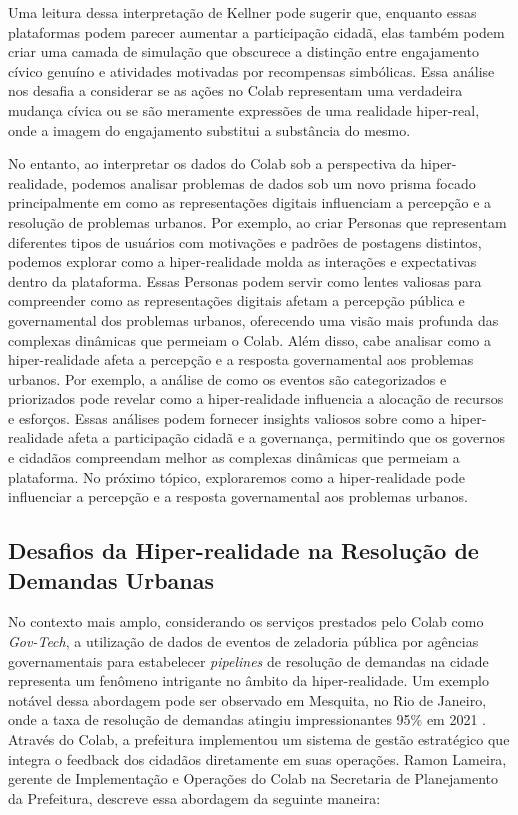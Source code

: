 Uma leitura dessa interpretação de Kellner pode sugerir que, enquanto essas plataformas podem parecer aumentar a participação cidadã, elas também podem criar uma camada de simulação que obscurece a distinção entre engajamento cívico genuíno e atividades motivadas por recompensas simbólicas. Essa análise nos desafia a considerar se as ações no Colab representam uma verdadeira mudança cívica ou se são meramente expressões de uma realidade hiper-real, onde a imagem do engajamento substitui a substância do mesmo.

No entanto, ao interpretar os dados do Colab sob a perspectiva da hiper-realidade, podemos analisar problemas de dados sob um novo prisma focado principalmente em como as representações digitais influenciam a percepção e a resolução de problemas urbanos. Por exemplo, ao criar Personas que representam diferentes tipos de usuários com motivações e padrões de postagens distintos, podemos explorar como a hiper-realidade molda as interações e expectativas dentro da plataforma. Essas Personas podem servir como lentes valiosas para compreender como as representações digitais afetam a percepção pública e governamental dos problemas urbanos, oferecendo uma visão mais profunda das complexas dinâmicas que permeiam o Colab. Além disso, cabe analisar como a hiper-realidade afeta a percepção e a resposta governamental aos problemas urbanos. Por exemplo, a análise de como os eventos são categorizados e priorizados pode revelar como a hiper-realidade influencia a alocação de recursos e esforços. Essas análises podem fornecer insights valiosos sobre como a hiper-realidade afeta a participação cidadã e a governança, permitindo que os governos e cidadãos compreendam melhor as complexas dinâmicas que permeiam a plataforma. No próximo tópico, exploraremos como a hiper-realidade pode influenciar a percepção e a resposta governamental aos problemas urbanos.

\subsection*{Desafios da Hiper-realidade na Resolução de Demandas Urbanas}

No contexto mais amplo, considerando os serviços prestados pelo Colab como \textit{Gov-Tech}, a utilização de dados de eventos de zeladoria pública por agências governamentais para estabelecer \textit{pipelines} de resolução de demandas na cidade representa um fenômeno intrigante no âmbito da hiper-realidade. Um exemplo notável dessa abordagem pode ser observado em Mesquita, no Rio de Janeiro, onde a taxa de resolução de demandas atingiu impressionantes 95\% em 2021 \cite{2021_Colab_PAGE}. Através do Colab, a prefeitura implementou um sistema de gestão estratégico que integra o feedback dos cidadãos diretamente em suas operações. Ramon Lameira, gerente de Implementação e Operações do Colab na Secretaria de Planejamento da Prefeitura, descreve essa abordagem da seguinte maneira:

